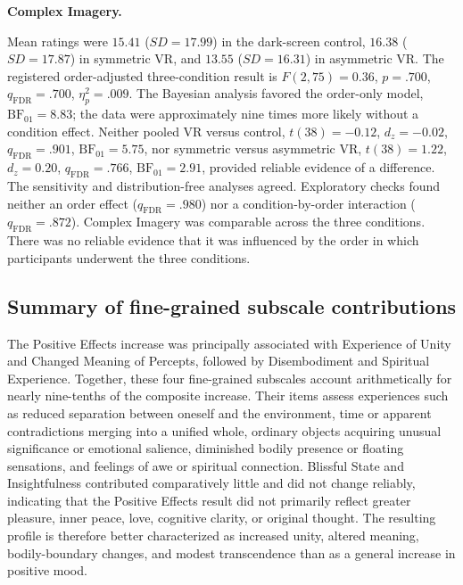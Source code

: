 \documentclass[pdflatex,sn-basic,lineno]{../sn-jnl}
\begin{document}
\medskip\noindent\textbf{Complex Imagery.}\nopagebreak[4]

Mean ratings were $15.41$ ($SD=17.99$) in the dark-screen control, $16.38$ ($SD=17.87$) in symmetric VR, and $13.55$ ($SD=16.31$) in asymmetric VR. The registered order-adjusted three-condition result is $F(2,75)=0.36$, $p=.700$, $q_{\mathrm{FDR}}=.700$, $\eta_p^2=.009$. The Bayesian analysis favored the order-only model, $\mathrm{BF}_{01}=8.83$; the data were approximately nine times more likely without a condition effect. Neither pooled VR versus control, $t(38)=-0.12$, $d_z=-0.02$, $q_{\mathrm{FDR}}=.901$, $\mathrm{BF}_{01}=5.75$, nor symmetric versus asymmetric VR, $t(38)=1.22$, $d_z=0.20$, $q_{\mathrm{FDR}}=.766$, $\mathrm{BF}_{01}=2.91$, provided reliable evidence of a difference. The sensitivity and distribution-free analyses agreed. Exploratory checks found neither an order effect ($q_{\mathrm{FDR}}=.980$) nor a condition-by-order interaction ($q_{\mathrm{FDR}}=.872$). Complex Imagery was comparable across the three conditions. There was no reliable evidence that it was influenced by the order in which participants underwent the three conditions.

\subsection{Summary of fine-grained subscale contributions}
\label{subsec:supp_asc_drivers}

The Positive Effects increase was principally associated with Experience of Unity and Changed Meaning of Percepts, followed by Disembodiment and Spiritual Experience. Together, these four fine-grained subscales account arithmetically for nearly nine-tenths of the composite increase. Their items assess experiences such as reduced separation between oneself and the environment, time or apparent contradictions merging into a unified whole, ordinary objects acquiring unusual significance or emotional salience, diminished bodily presence or floating sensations, and feelings of awe or spiritual connection. Blissful State and Insightfulness contributed comparatively little and did not change reliably, indicating that the Positive Effects result did not primarily reflect greater pleasure, inner peace, love, cognitive clarity, or original thought. The resulting profile is therefore better characterized as increased unity, altered meaning, bodily-boundary changes, and modest transcendence than as a general increase in positive mood.
\end{document}
